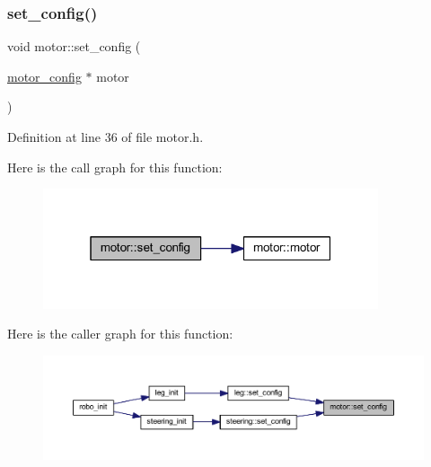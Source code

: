 \mbox{\label{classmotor_a4580801b17e4b05384ab89ece8c3ca12}} 
\subsubsection{\texorpdfstring{set\_config()}{set\_config()}}
{\footnotesize\ttfamily void motor\+::set\+\_\+config (\begin{DoxyParamCaption}\item[{\mbox{\hyperlink{structmotor__config}{motor\+\_\+config}} $\ast$}]{motor }\end{DoxyParamCaption})\hspace{0.3cm}{\ttfamily [inline]}}



Definition at line 36 of file motor.\+h.

Here is the call graph for this function\+:
\nopagebreak
\begin{figure}[H]
\begin{center}
\leavevmode
\includegraphics[width=280pt]{classmotor_a4580801b17e4b05384ab89ece8c3ca12_cgraph}
\end{center}
\end{figure}
Here is the caller graph for this function\+:
\nopagebreak
\begin{figure}[H]
\begin{center}
\leavevmode
\includegraphics[width=350pt]{classmotor_a4580801b17e4b05384ab89ece8c3ca12_icgraph}
\end{center}
\end{figure}
\mbox{\label{classmotor_a788528b29d950ce81e3e9a41eb1977a3}} 
